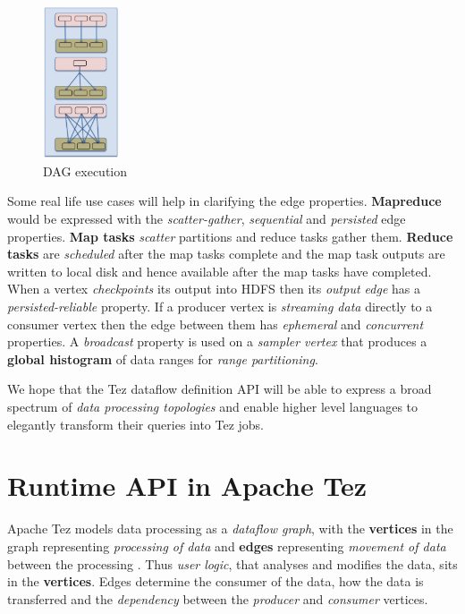 \documentclass[twocolumn]{article}
\begin{document}
\begin{figure}[htb]
        \centering
        \includegraphics[width=0.2\textwidth]{tez31}
        \caption{DAG execution}
        \label{fig09}
\end{figure}

Some real life use cases will help in clarifying the edge properties.
\textbf{Mapreduce} would be expressed with the \emph{scatter-gather},
\emph{sequential} and \emph{persisted} edge properties. \textbf{Map
tasks} \emph{scatter} partitions and reduce tasks gather them.
\textbf{Reduce tasks} are \emph{scheduled} after the map tasks complete
and the map task outputs are written to local disk and hence available
after the map tasks have completed. When a vertex \emph{checkpoints} its
output into HDFS then its \emph{output edge} has a
\emph{persisted-reliable} property. If a producer vertex is
\emph{streaming data} directly to a consumer vertex then the edge
between them has \emph{ephemeral} and \emph{concurrent} properties. A
\emph{broadcast} property is used on a \emph{sampler vertex} that
produces a \textbf{global histogram} of data ranges for \emph{range
partitioning}.

We hope that the Tez dataflow definition API will be able to express a
broad spectrum of \emph{data processing topologies} and enable higher
level languages to elegantly transform their queries into Tez jobs.

\section{Runtime API in Apache Tez}
Apache Tez models data processing as a \emph{dataflow graph}, with the
\textbf{vertices} in the graph representing \emph{processing of data}
and \textbf{edges} representing \emph{movement of data} between the
processing \cite{Saha:2013-03}. Thus \emph{user logic}, that analyses and modifies the data,
sits in the \textbf{vertices}. Edges determine the consumer of the data,
how the data is transferred and the \emph{dependency} between the
\emph{producer} and \emph{consumer} vertices.
\end{document}
